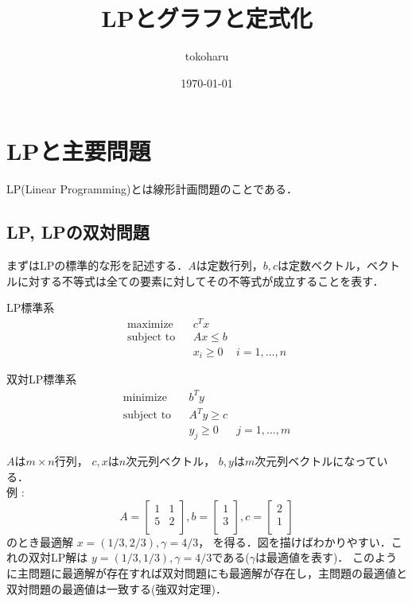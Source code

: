 \documentclass[13pt, a4paper, landscape]{jarticle}
\title{LPとグラフと定式化}
\author{tokoharu}
\date {\today}
\theoremstyle{nonitalic} %
\begin{document}
\maketitle

\section{LPと主要問題}
LP(Linear Programming)とは線形計画問題のことである．
\subsection {LP, LPの双対問題}
まずはLPの標準的な形を記述する．$A$は定数行列，$b, c$は定数ベクトル，ベクトルに対する不等式は全ての要素に対してその不等式が成立することを表す．

LP標準系
\begin{align}
 &&&&&\textrm{maximize}   && c^Tx \\
 &&&&&\textrm{subject to} && Ax \leq b  &&&&&\\
 &&&&&                    && x_i \geq 0 & i = 1,...,n &&&&&
\end{align}

双対LP標準系
\begin{align}
 &&&&&\textrm{minimize}   && b^Ty \\
 &&&&&\textrm{subject to} && A^T y \geq c  &&&&&\\
 &&&&&                    && y_j \geq 0 & j = 1,...,m &&&&&
\end{align}

 
$A$は$m\times n$行列， 
$c,x$は$n$次元列ベクトル， 
$b,y$は$m$次元列ベクトルになっている． \\

例 : 
\begin{equation*}
 A = 
 \left[\begin{array}{cc}
  1 & 1 \\
  5 & 2 \\
 \end{array}\right],
 b = 
 \left[\begin{array}{c}
     1 \\
     3 \\
   \end{array}\right],
 c = 
 \left[\begin{array}{c}
     2 \\
     1 \\
 \end{array}\right]
\end{equation*}
のとき最適解 $x = (1/3, 2/3) , \gamma = 4/3  $， を得る．図を描けばわかりやすい．これの双対LP解は
$y = (1/3, 1/3), \gamma = 4/3$である($\gamma$は最適値を表す)．
このように主問題に最適解が存在すれば双対問題にも最適解が存在し，主問題の最適値と双対問題の最適値は一致する(強双対定理)．
\end{document}
